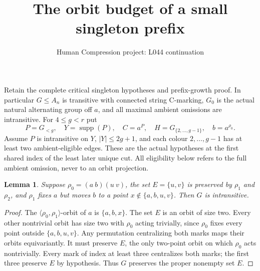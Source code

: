 \documentclass[11pt,a4paper]{article}
\title{The orbit budget of a small singleton prefix}
\author{Human Compression project: L044 continuation}
\date{}
\newtheorem{lemma}{Lemma}
\newcommand{\gen}[1]{\langle#1\rangle}
\begin{document}
\maketitle
Retain the complete critical singleton hypotheses and prefix-growth
proof. In particular $G\le A_n$ is transitive with connected string
C-marking, $G_0$ is the actual natural alternating group off $a$,
and all maximal ambient omissions are intransitive.
For $4\le g<r$ put
\[
 P=G_{<g},\quad Y=\operatorname{supp}(P),\quad
 C=a^P,\quad H=G_{\{2,\ldots,g-1\}},\quad b=a^{\rho_0}.
\]
Assume $P$ is intransitive on $Y$, $|Y|\le2g+1$, and each
colour $2,\ldots,g-1$ has at least two ambient-eligible edges.
These are the actual hypotheses at the first shared index of the
least later unique cut. All eligibility below refers to the full
ambient omission, never to an orbit projection.

\begin{lemma}\label{pair}
Suppose $\rho_0=(a\ b)(u\ v)$, the set $E=\{u,v\}$
is preserved by $\rho_1$ and $\rho_2$, and $\rho_1$ fixes
$a$ but moves $b$ to a point $x\notin\{a,b,u,v\}$.
Then $G$ is intransitive.
\end{lemma}
\begin{proof}
The $\gen{\rho_0,\rho_1}$-orbit of $a$ is $\{a,b,x\}$.
The set $E$ is an orbit of size two. Every other nontrivial orbit
has size two with $\rho_0$ acting trivially, since $\rho_0$
fixes every point outside $\{a,b,u,v\}$.
Any permutation centralizing both marks maps their orbits
equivariantly. It must preserve $E$, the only two-point orbit
on which $\rho_0$ acts nontrivially. Every mark of index at least
three centralizes both marks; the first three preserve $E$ by
hypothesis. Thus $G$ preserves the proper nonempty set $E$.
\end{proof}
\end{document}
